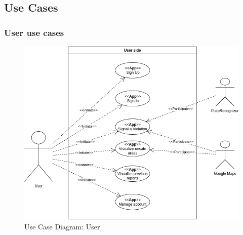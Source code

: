 \documentclass{article}
\begin{document}
\subsection{Use Cases}
\subsubsection{User use cases}
\begin{figure}[H]
    \centering
    \includegraphics[scale=0.5]{Images/UseCaseUserView}
    \caption{Use Case Diagram: User}
\end{figure}
\end{document}
